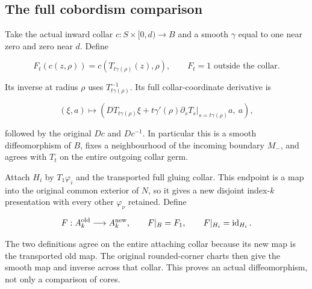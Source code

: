 \subsection{The full cobordism comparison}
\label{courseIII:higher-index-framed-slides-and-chain-maps:higher-slide-cobordism}

\label{courseIII:higher-index-framed-slides-and-chain-maps:section-3}\label{courseIII:higher-slides:3}

Take the actual inward collar \(c:S\times[0,d)\to B\) and a smooth \(\gamma\) equal to one near zero and zero near \(d\). Define

\begin{equation}
F_t(c(z,\rho))=c(T_{t\gamma(\rho)}(z),\rho),
 \qquad F_t=1\text{ outside the collar}.
 \label{courseIII:higher-index-framed-slides-and-chain-maps:eq:3.1}
\end{equation}

Its inverse at radius \(\rho\) uses \(T_{t\gamma(\rho)}^{-1}\). Its full collar-coordinate derivative is

\begin{equation}
(\xi,a)\longmapsto
 \left(DT_{t\gamma(\rho)}\xi
       +t\gamma'(\rho)
           \left.\partial_sT_s\right|_{s=t\gamma(\rho)}a,\ a\right),
 \label{courseIII:higher-index-framed-slides-and-chain-maps:eq:3.2}
\end{equation}

followed by the original \(Dc\) and \(Dc^{-1}\). In particular this is a smooth diffeomorphism of \(B\), fixes a neighbourhood of the incoming boundary \(M_-\), and agrees with \(T_t\) on the entire outgoing collar germ.

Attach \(H_i\) by \(T_1\varphi_i\) and the transported full gluing collar. This endpoint is a map into the original common exterior of \(N\), so it gives a new disjoint index-\(k\) presentation with every other \(\varphi_\nu\) retained. Define

\begin{equation}
F:A_k^{\rm old}\longrightarrow A_k^{\rm new},
 \qquad F|_B=F_1,\qquad F|_{H_i}=\operatorname{id}_{H_i}.
 \label{courseIII:higher-index-framed-slides-and-chain-maps:eq:3.3}
\end{equation}

The two definitions agree on the entire attaching collar because its new map is the transported old map. The original rounded-corner charts then give the smooth map and inverse across that collar. This proves an actual diffeomorphism, not only a comparison of cores.


